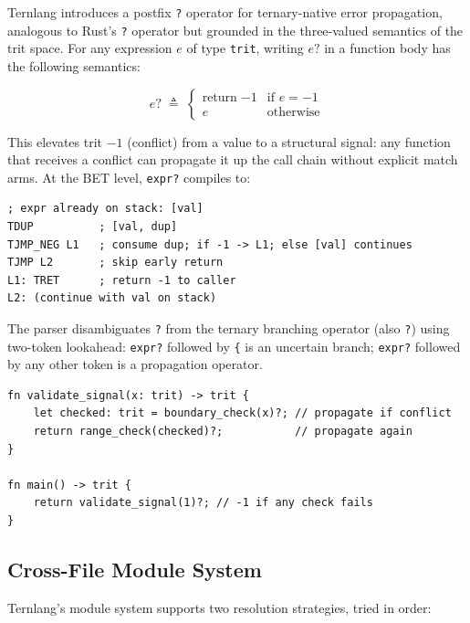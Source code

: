 \documentclass[11pt,a4paper]{article}
\begin{document}
Ternlang introduces a postfix \texttt{?} operator for ternary-native error
propagation, analogous to Rust's \texttt{?} operator but grounded in the
three-valued semantics of the trit space. For any expression $e$ of type
\texttt{trit}, writing $e\texttt{?}$ in a function body has the following
semantics:

\begin{equation}
  e\texttt{?} \;\triangleq\;
  \begin{cases}
    \text{return}\;{-1} & \text{if } e = {-1} \\
    e                   & \text{otherwise}
  \end{cases}
  \label{eq:propagate}
\end{equation}

This elevates trit $-1$ (conflict) from a value to a structural signal: any
function that receives a conflict can propagate it up the call chain without
explicit match arms. At the BET level, \texttt{expr?} compiles to:

\begin{lstlisting}[caption={BET bytecode for \texttt{expr?}}]
; expr already on stack: [val]
TDUP          ; [val, dup]
TJMP_NEG L1   ; consume dup; if -1 -> L1; else [val] continues
TJMP L2       ; skip early return
L1: TRET      ; return -1 to caller
L2: (continue with val on stack)
\end{lstlisting}

The parser disambiguates \texttt{?} from the ternary branching operator
(also \texttt{?}) using two-token lookahead: \texttt{expr?} followed by
\texttt{\{} is an uncertain branch; \texttt{expr?} followed by any other
token is a propagation operator.

\begin{lstlisting}[caption={Error propagation in a validation chain}]
fn validate_signal(x: trit) -> trit {
    let checked: trit = boundary_check(x)?; // propagate if conflict
    return range_check(checked)?;           // propagate again
}

fn main() -> trit {
    return validate_signal(1)?; // -1 if any check fails
}
\end{lstlisting}

\subsection{Cross-File Module System}
\label{subsec:modules}

Ternlang's module system supports two resolution strategies, tried in order:
\end{document}
